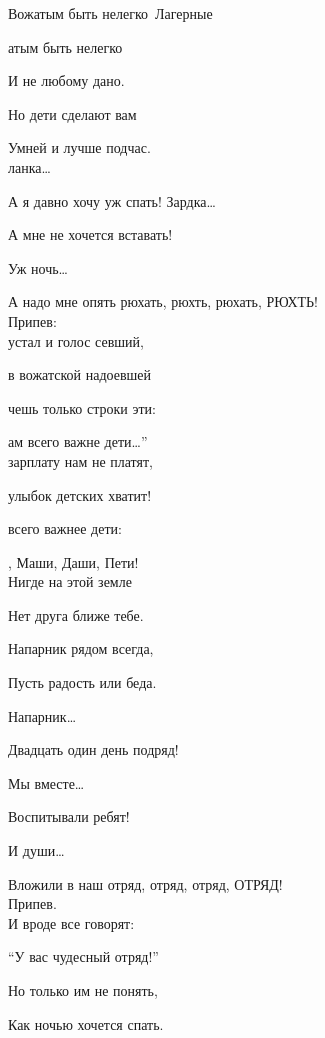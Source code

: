 \documentclass[11pt,a5paper]{book}
\renewcommand{\tt}{\indent \indent}
\begin{document}
\begin{song}{Вожатым быть нелегко}{}{~}{Лагерные}{}{}

атым быть нелегко\par
И не любому дано.\par
Но дети сделают вам\par
Умней и лучше подчас.\\

ланка…\par
А я давно хочу уж спать!
Зардка…\par
А мне не хочется вставать!\par
Уж ночь…\par
А надо мне опять рюхать, рюхть, рюхать, РЮХТЬ!\\

Припев:\\

\tt{} устал и голос севший,\par 
\tt{} в вожатской надоевшей\par
\tt{}чешь только строки эти:\par
\tt{}ам всего важне дети…”\\
 зарплату нам не платят,\par
{} улыбок детских хватит!\par
{} всего важнее дети:\par
{}, Маши, Даши, Пети!\\


Нигде на этой земле\par
Нет друга ближе тебе.\par
Напарник рядом всегда,\par
Пусть радость или беда.\\

\newpage

Напарник…\par
Двадцать один день подряд!\par
Мы вместе…\par
Воспитывали ребят!\par
И души…\par
Вложили в наш отряд, отряд, отряд, ОТРЯД!\\

Припев.\\

И вроде все говорят:\par
“У вас чудесный отряд!”\par
Но только им не понять,\par
Как ночью хочется спать.\\


\end{song}
\end{document}
